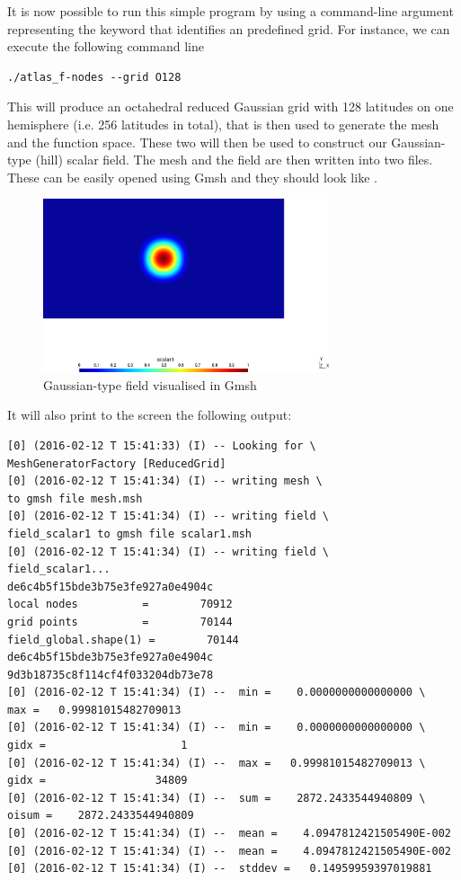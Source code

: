 %
It is now possible to run this simple program by using 
a command-line argument representing the keyword that 
identifies an \Atlas predefined grid.  For instance, 
we can execute the following command line
%
\begin{lstlisting}[style=BashStyle]
./atlas_f-nodes --grid O128
\end{lstlisting}
% 
This will produce an octahedral reduced Gaussian grid 
with 128 latitudes on one hemisphere (i.e. 256 latitudes 
in total), that is then used to generate the mesh and the 
 function space. These two will then be used 
to construct our Gaussian-type (hill) scalar field.
The mesh and the field are then written into two 
files. These can be easily opened using Gmsh and they should 
look like .
%
\begin{figure}%
\centering
\includegraphics[width=0.75\textwidth]{imgs/O128-field.png}
\caption{Gaussian-type field visualised in Gmsh}%
\label{fig:fs_nodes-F}%
\end{figure}
%
It will also print to the screen the following output:
%
\begin{lstlisting}[style=BashStyle]
[0] (2016-02-12 T 15:41:33) (I) -- Looking for \ 
MeshGeneratorFactory [ReducedGrid]
[0] (2016-02-12 T 15:41:34) (I) -- writing mesh \ 
to gmsh file mesh.msh
[0] (2016-02-12 T 15:41:34) (I) -- writing field \ 
field_scalar1 to gmsh file scalar1.msh
[0] (2016-02-12 T 15:41:34) (I) -- writing field \
field_scalar1...
de6c4b5f15bde3b75e3fe927a0e4904c
local nodes          =        70912
grid points          =        70144
field_global.shape(1) =        70144
de6c4b5f15bde3b75e3fe927a0e4904c
9d3b18735c8f114cf4f033204db73e78
[0] (2016-02-12 T 15:41:34) (I) --  min =    0.0000000000000000 \      
max =   0.99981015482709013
[0] (2016-02-12 T 15:41:34) (I) --  min =    0.0000000000000000 \ 
gidx =                     1
[0] (2016-02-12 T 15:41:34) (I) --  max =   0.99981015482709013 \
gidx =                 34809
[0] (2016-02-12 T 15:41:34) (I) --  sum =    2872.2433544940809 \      
oisum =    2872.2433544940809
[0] (2016-02-12 T 15:41:34) (I) --  mean =    4.0947812421505490E-002
[0] (2016-02-12 T 15:41:34) (I) --  mean =    4.0947812421505490E-002
[0] (2016-02-12 T 15:41:34) (I) --  stddev =   0.14959959397019881

\end{lstlisting}
